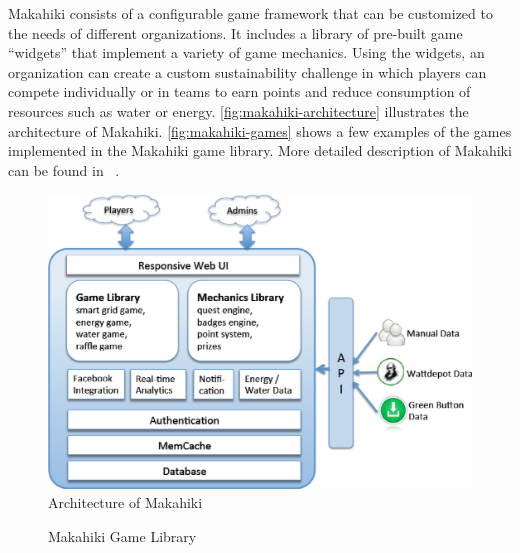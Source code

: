 \documentclass{sigchi}
\begin{document}
Makahiki consists of a configurable game framework that can be customized
to the needs of different organizations. It includes a library of
pre-built game ``widgets'' that implement a variety of game mechanics.
Using the widgets, an organization can create a custom sustainability
challenge in which players can compete individually or in teams to
earn points and reduce consumption of resources such as water or energy.
\autoref{fig:makahiki-architecture} illustrates the architecture of
Makahiki. \autoref{fig:makahiki-games} shows a few examples of the
games implemented in the Makahiki game library. More detailed
description of Makahiki can be found in ~\cite{csdl2-12-06}.

\begin{figure}[ht!]
  \center
  \includegraphics[width=\columnwidth]{makahiki-system-architecture}
  \caption{Architecture of Makahiki}
  \label{fig:makahiki-architecture}
\end{figure}

\begin{figure}[ht!]
	\center
		\caption{Makahiki Game Library}
		\label{fig:makahiki-games}
\end{figure}
\end{document}
